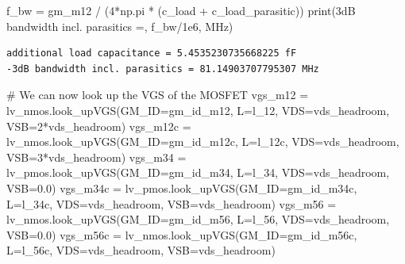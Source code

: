 \documentclass[
  a4paper,
  DIV=11,
  numbers=noendperiod]{scrartcl}
\newenvironment{Shaded}{\begin{snugshade}}{\end{snugshade}}
\newcommand{\BuiltInTok}[1]{\textcolor[rgb]{0.00,0.23,0.31}{#1}}
\newcommand{\CommentTok}[1]{\textcolor[rgb]{0.37,0.37,0.37}{#1}}
\newcommand{\DecValTok}[1]{\textcolor[rgb]{0.68,0.00,0.00}{#1}}
\newcommand{\FloatTok}[1]{\textcolor[rgb]{0.68,0.00,0.00}{#1}}
\newcommand{\NormalTok}[1]{\textcolor[rgb]{0.00,0.23,0.31}{#1}}
\newcommand{\OperatorTok}[1]{\textcolor[rgb]{0.37,0.37,0.37}{#1}}
\newcommand{\StringTok}[1]{\textcolor[rgb]{0.13,0.47,0.30}{#1}}
\begin{document}
\begin{tcolorbox}
\begin{Shaded}
\begin{Highlighting}[]
\NormalTok{f\_bw }\OperatorTok{=}\NormalTok{ gm\_m12 }\OperatorTok{/}\NormalTok{ (}\DecValTok{4}\OperatorTok{*}\NormalTok{np.pi }\OperatorTok{*}\NormalTok{ (c\_load }\OperatorTok{+}\NormalTok{ c\_load\_parasitic))}
\BuiltInTok{print}\NormalTok{(}\StringTok{\textquotesingle{}{-}3dB bandwidth incl. parasitics =\textquotesingle{}}\NormalTok{, f\_bw}\OperatorTok{/}\FloatTok{1e6}\NormalTok{, }\StringTok{\textquotesingle{}MHz\textquotesingle{}}\NormalTok{)}
\end{Highlighting}
\end{Shaded}

\begin{verbatim}
additional load capacitance = 5.4535230735668225 fF
-3dB bandwidth incl. parasitics = 81.14903707795307 MHz
\end{verbatim}

\begin{Shaded}
\begin{Highlighting}[]
\CommentTok{\# We can now look up the VGS of the MOSFET}
\NormalTok{vgs\_m12 }\OperatorTok{=}\NormalTok{ lv\_nmos.look\_upVGS(GM\_ID}\OperatorTok{=}\NormalTok{gm\_id\_m12, L}\OperatorTok{=}\NormalTok{l\_12, VDS}\OperatorTok{=}\NormalTok{vds\_headroom, VSB}\OperatorTok{=}\DecValTok{2}\OperatorTok{*}\NormalTok{vds\_headroom)}
\NormalTok{vgs\_m12c }\OperatorTok{=}\NormalTok{ lv\_nmos.look\_upVGS(GM\_ID}\OperatorTok{=}\NormalTok{gm\_id\_m12c, L}\OperatorTok{=}\NormalTok{l\_12c, VDS}\OperatorTok{=}\NormalTok{vds\_headroom, VSB}\OperatorTok{=}\DecValTok{3}\OperatorTok{*}\NormalTok{vds\_headroom)}
\NormalTok{vgs\_m34 }\OperatorTok{=}\NormalTok{ lv\_pmos.look\_upVGS(GM\_ID}\OperatorTok{=}\NormalTok{gm\_id\_m34, L}\OperatorTok{=}\NormalTok{l\_34, VDS}\OperatorTok{=}\NormalTok{vds\_headroom, VSB}\OperatorTok{=}\FloatTok{0.0}\NormalTok{) }
\NormalTok{vgs\_m34c }\OperatorTok{=}\NormalTok{ lv\_pmos.look\_upVGS(GM\_ID}\OperatorTok{=}\NormalTok{gm\_id\_m34c, L}\OperatorTok{=}\NormalTok{l\_34c, VDS}\OperatorTok{=}\NormalTok{vds\_headroom, VSB}\OperatorTok{=}\NormalTok{vds\_headroom) }
\NormalTok{vgs\_m56 }\OperatorTok{=}\NormalTok{ lv\_nmos.look\_upVGS(GM\_ID}\OperatorTok{=}\NormalTok{gm\_id\_m56, L}\OperatorTok{=}\NormalTok{l\_56, VDS}\OperatorTok{=}\NormalTok{vds\_headroom, VSB}\OperatorTok{=}\FloatTok{0.0}\NormalTok{) }
\NormalTok{vgs\_m56c }\OperatorTok{=}\NormalTok{ lv\_nmos.look\_upVGS(GM\_ID}\OperatorTok{=}\NormalTok{gm\_id\_m56c, L}\OperatorTok{=}\NormalTok{l\_56c, VDS}\OperatorTok{=}\NormalTok{vds\_headroom, VSB}\OperatorTok{=}\NormalTok{vds\_headroom) }


\end{Highlighting}
\end{Shaded}
\end{tcolorbox}
\end{document}
